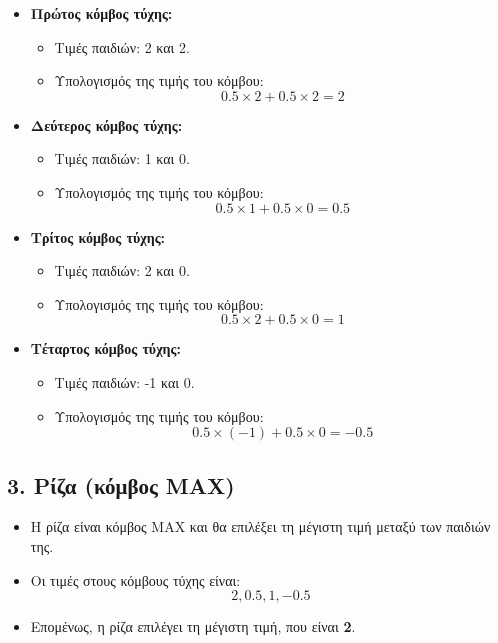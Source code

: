 \documentclass{article}
\begin{document}
\begin{itemize}
    \item \textbf{Πρώτος κόμβος τύχης:}
    \begin{itemize}
        \item Τιμές παιδιών: 2 και 2.
        \item Υπολογισμός της τιμής του κόμβου:
        \[
        0.5 \times 2 + 0.5 \times 2 = 2
        \]
    \end{itemize}

    \item \textbf{Δεύτερος κόμβος τύχης:}
    \begin{itemize}
        \item Τιμές παιδιών: 1 και 0.
        \item Υπολογισμός της τιμής του κόμβου:
        \[
        0.5 \times 1 + 0.5 \times 0 = 0.5
        \]
    \end{itemize}

    \item \textbf{Τρίτος κόμβος τύχης:}
    \begin{itemize}
        \item Τιμές παιδιών: 2 και 0.
        \item Υπολογισμός της τιμής του κόμβου:
        \[
        0.5 \times 2 + 0.5 \times 0 = 1
        \]
    \end{itemize}

    \item \textbf{Τέταρτος κόμβος τύχης:}
    \begin{itemize}
        \item Τιμές παιδιών: -1 και 0.
        \item Υπολογισμός της τιμής του κόμβου:
        \[
        0.5 \times (-1) + 0.5 \times 0 = -0.5
        \]
    \end{itemize}
\end{itemize}

\subsection*{3. Ρίζα (κόμβος MAX)}

\begin{itemize}
    \item Η ρίζα είναι κόμβος MAX και θα επιλέξει τη μέγιστη τιμή μεταξύ των παιδιών της.
    \item Οι τιμές στους κόμβους τύχης είναι:
    \[
    2, 0.5, 1, -0.5
    \]
    \item Επομένως, η ρίζα επιλέγει τη μέγιστη τιμή, που είναι \textbf{2}.
\end{itemize}
\end{document}
